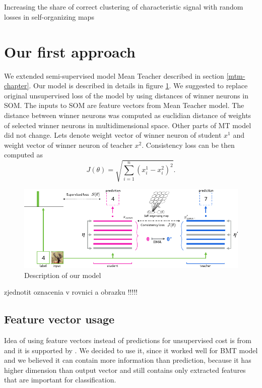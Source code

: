 \subsection{}
\color{red}Increasing the share of correct clustering of characteristic signal with random losses in self-organizing maps
\color{black}

\section{Our first approach}
We extended semi-supervised model Mean Teacher described in section \ref{mtm-chapter}. Our model is described in details in figure \ref{fig:our-model}. We suggested to replace original unsupervised loss of the model by using distances of winner neurons in SOM. The inputs to SOM are feature vectors from Mean Teacher model. The distance between winner neurons was computed as euclidian distance of weights of selected winner neurons in multidimensional space. Other parts of MT model did not change. Lets denote weight vector of winner neuron of student $x^{1}$ and weight vector of winner neuron of teacher $x^{2}$. Consistency loss can be then computed as $$J(\theta) = \sqrt{\sum_{i=1}^n {(x^1_i - x^2_i)}^2}.$$ 
\begin{figure}[h!]
    \centering
    \includegraphics{figs/mean_teacher_som-1.pdf}
    \caption{Description of our model}
    \label{fig:our-model}
\end{figure}


\color{red} zjednotit oznacenia v rovnici a obrazku !!!!! \color{black}

\subsection{Feature vector usage}
Idea of using feature vectors instead of predictions for unsupervised cost is from \cite{tuna-bmt} and it is supported by \cite{desom2019}. We decided to use it, since it worked well for BMT model and we believed it can contain more information than prediction, because it has higher dimension than output vector and still contains only extracted features that are important for classification.


